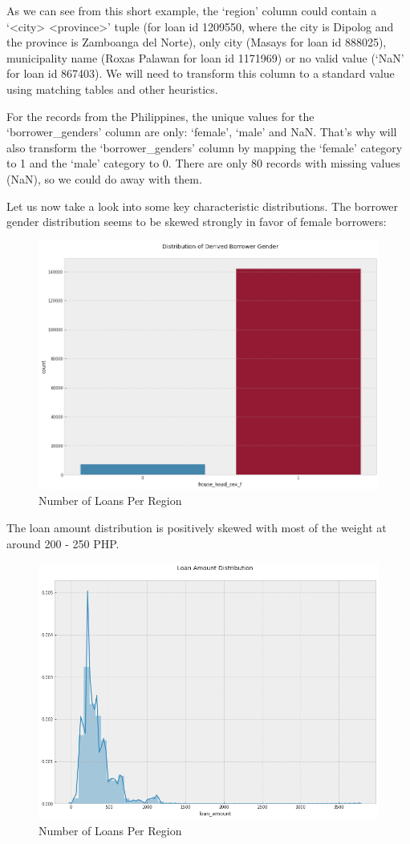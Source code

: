 \documentclass{article}
\begin{document}
As we can see from this short example, the ‘region’ column could contain a ‘<city> <province>’ tuple (for loan id 1209550, where the city is Dipolog and the province is Zamboanga del Norte), only city (Masays for loan id 888025), municipality name (Roxas Palawan for loan id 1171969) or no valid value (‘NaN’ for loan id 867403). We will need to transform this column to a standard value using matching tables and other heuristics.

For the records from the Philippines, the unique values for the ‘borrower\_genders’ column are only: ‘female’, ‘male’ and NaN. That’s why will also transform the ‘borrower\_genders’ column by mapping the ‘female’ category to 1 and the ‘male’ category to 0. There are only 80 records with missing values (NaN), so we could do away with them.

Let us now take a look into some key characteristic distributions. The borrower gender distribution seems to be skewed strongly in favor of female borrowers:

\begin{figure}[H]
\caption{Number of Loans Per Region}
\centering
\includegraphics[width = 0.7 \textwidth]{borrower_gender_distribution}
\end{figure}

The loan amount distribution is positively skewed with most of the weight at around 200 - 250 PHP.

\begin{figure}[H]
\caption{Number of Loans Per Region}
\centering
\includegraphics[width = 0.7 \textwidth]{kiva_loan_distribution}
\end{figure}
\end{document}
